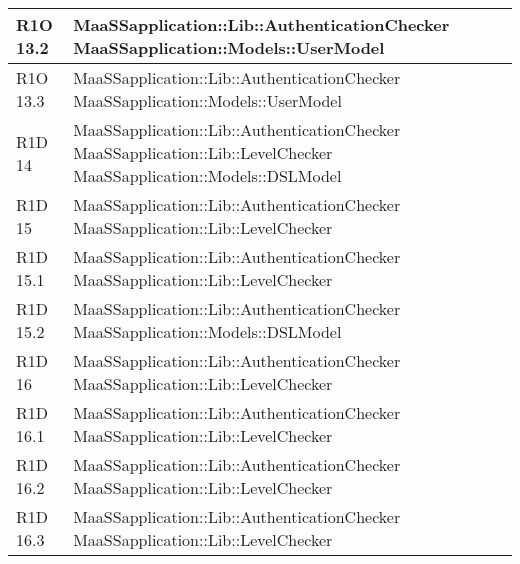 \begin{center}
\begin{longtable}{ | l | p{8cm} |}
	R1O 13.2 & MaaSSapplication::Lib::AuthenticationChecker \newline MaaSSapplication::Models::UserModel  \newline  \\ \hline
	
	R1O 13.3 & MaaSSapplication::Lib::AuthenticationChecker \newline MaaSSapplication::Models::UserModel  \\ \hline


    R1D 14 & MaaSSapplication::Lib::AuthenticationChecker \newline MaaSSapplication::Lib::LevelChecker \newline  MaaSSapplication::Models::DSLModel \newline \\ \hline
    
    R1D 15 & MaaSSapplication::Lib::AuthenticationChecker \newline MaaSSapplication::Lib::LevelChecker  \newline \\ \hline
    
    R1D 15.1 & MaaSSapplication::Lib::AuthenticationChecker \newline MaaSSapplication::Lib::LevelChecker \newline \\ \hline
    
    R1D 15.2 & MaaSSapplication::Lib::AuthenticationChecker \newline  MaaSSapplication::Models::DSLModel \\ \hline
    
    R1D 16 & MaaSSapplication::Lib::AuthenticationChecker \newline MaaSSapplication::Lib::LevelChecker \\ \hline

    R1D 16.1 & MaaSSapplication::Lib::AuthenticationChecker \newline MaaSSapplication::Lib::LevelChecker \\ \hline
    
    R1D 16.2 & MaaSSapplication::Lib::AuthenticationChecker \newline MaaSSapplication::Lib::LevelChecker \\ \hline

    R1D 16.3 & MaaSSapplication::Lib::AuthenticationChecker \newline MaaSSapplication::Lib::LevelChecker \\ \hline


\end{longtable}
\end{center}
